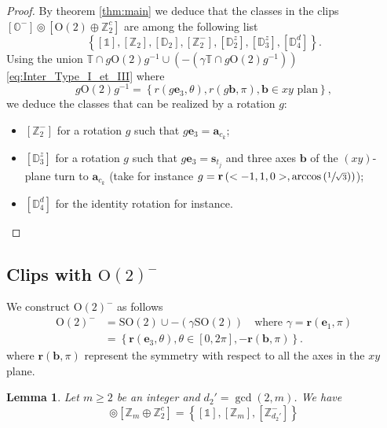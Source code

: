 \documentclass[11pt,a4paper]{amsart}
\newtheorem{lem}[thm]{Lemma}
\theoremstyle{definition}
\newcommand{\ZZ}{\mathbb{Z}}                %
\newcommand{\OO}{\mathrm{O}}                %
\newcommand{\SO}{\mathrm{SO}}               %
\newcommand{\octa}{\mathbb{O}}              %
\newcommand{\tetra}{\mathbb{T}}             %
\newcommand{\DD}{\mathbb{D}}                %
\newcommand{\1}{\mathds{1}}		            %
\newcommand{\ee}{\pmb{e}}                   %
\newcommand{\vR}{\mathbf{r}}
\newcommand{\bb}{\mathbf{b}}
\newcommand{\set}[1]{\left\{#1\right\}}     %
\begin{document}
\begin{proof}
		By theorem \ref{thm:main} we deduce that the classes in the clips $[\octa^-] \circledcirc [\OO(2) \oplus \ZZ_2^c]$ are among the following list
	\begin{equation*}
		\set{[\1],[\ZZ_2],[\DD_2],[\ZZ_2^-],[\DD_2^z],[\DD_3^z],[\DD_4^d]}.
	\end{equation*} 
	Using the union $ \tetra\cap g\OO(2)g^{-1} \cup (-(\gamma\tetra\cap g\OO(2)g^{-1}))$ \eqref{eq:Inter_Type_I_et_III} 	where $$g\OO(2)g^{-1}=\set{r(g\ee_3,\theta),r(g\bb,\pi),\bb\in xy \text{ plan}},$$ we deduce the classes that can be realized by a rotation $g$:
	\begin{itemize}
		\item $[\ZZ_2^-]$ for a rotation $g$ such that $g\ee_3=\pmb{a}_{c_k}$;
		\item $[\DD_3^z]$ for a rotation $g$ such that $g\ee_3=\pmb{s}_{t_j}$ and three axes $\bb$ of the $(xy)$-plane turn to $\pmb{a}_{c_k}$ (take for instance $g=\vR\left(<-1,1,0>,\arccos\left(\sfrac{1}{\sqrt{3}}\right)\right)$);
		\item $[\DD_{4}^d]$ for the identity rotation for instance.
	\end{itemize}
\end{proof}

\subsection{Clips with $\OO(2)^-$}



We construct $\OO(2)^-$ as follows
\begin{align*}
  \OO(2)^- & =\SO(2)\cup -(\gamma \SO(2)) \quad \text{where } \gamma=\vR(\ee_1,\pi) \\
           & =\set{\vR(\ee_3,\theta),\theta \in [0,2\pi],-\vR(\bb,\pi)}.
\end{align*}
where $\vR(\bb,\pi)$ represent the symmetry with respect to all the axes in the $xy$ plane.



\begin{lem}
  Let $m\geq 2$ be an integer and $d_2'=\gcd(2,m)$. We have
  \begin{equation*}
    [\OO(2)^-]\circledcirc [\ZZ_m \oplus \ZZ_2^c]=
    \set{ [\1],[\ZZ_m],[\ZZ_{d_2'}^-] }
  \end{equation*}
\end{lem}
\end{document}
